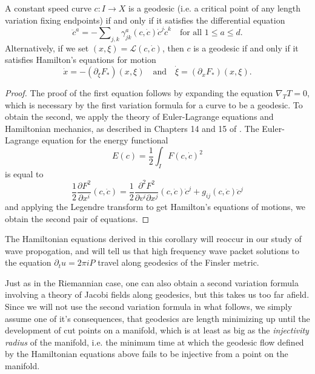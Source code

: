 \begin{corollary}
  A constant speed curve $c: I \to X$ is a geodesic (i.e. a critical point of any length variation fixing endpoints) if and only if it satisfies the differential equation
  \[ \ddot{c}^a = - \sum\nolimits_{j,k} \gamma^a_{jk}(c,\dot{c}) \dot{c}^j \dot{c}^k \quad\text{for all $1 \leq a \leq d$}. \]
  Alternatively, if we set $(x,\xi) = \mathcal{L}(c,\dot{c})$, then $c$ is a geodesic if and only if it satisfies Hamilton's equations for motion
  \[ \dot{x} = - (\partial_\xi F_*)(x,\xi) \quad\text{and}\quad \dot{\xi} = (\partial_x F_*)(x,\xi). \]

\end{corollary}
\begin{proof}
  The proof of the first equation follows by expanding the equation $\nabla_T T = 0$, which is necessary by the first variation formula for a curve to be a geodesic. To obtain the second, we apply the theory of Euler-Lagrange equations and Hamiltonian mechanics, as described in Chapters 14 and 15 of \cite{Arnold}. The Euler-Lagrange equation for the energy functional
  \begin{equation}
    E(c) = \frac{1}{2} \int_I F(c,\dot{c})^2
  \end{equation}
  is equal to
  \begin{equation}
    \frac{1}{2} \frac{\partial F^2}{\partial x^i}(c,\dot{c}) = \frac{1}{2} \frac{\partial^2 F^2}{\partial v^i \partial x^j}(c,\dot{c}) \dot{c}^j + g_{ij}(c,\dot{c}) \ddot{c}^j
  \end{equation}
  and applying the Legendre transform to get Hamilton's equations of motions, we obtain the second pair of equations.
\end{proof}

\begin{remark}
  The Hamiltonian equations derived in this corollary will reoccur in our study of wave propogation, and will tell us that high frequency wave packet solutions to the equation $\partial_t u = 2 \pi i P$ travel along geodesics of the Finsler metric.
\end{remark}

Just as in the Riemannian case, one can also obtain a second variation formula involving a theory of Jacobi fields along geodesics, but this takes us too far afield. Since we will not use the second variation formula in what follows, we simply assume one of it's consequences, that geodesics are length minimizing up until the development of cut points on a manifold, which is at least as big as the \emph{injectivity radius} of the manifold, i.e. the minimum time at which the geodesic flow defined by the Hamiltonian equations above fails to be injective from a point on the manifold.

